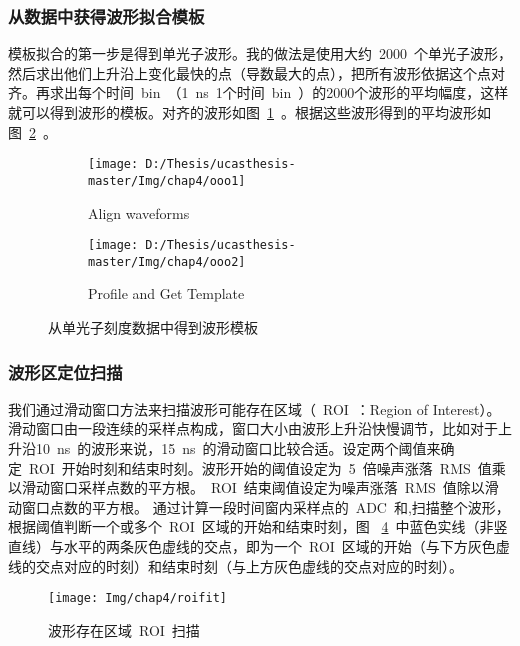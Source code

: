\subsubsection{从数据中获得波形拟合模板}
模板拟合的第一步是得到单光子波形。我的做法是使用大约~2000~个单光子波形，然后求出他们上升沿上变化最快的点（导数最大的点），把所有波形依据这个点对齐。再求出每个时间~bin~（1~ns~1个时间~bin~）的2000个波形的平均幅度，这样就可以得到波形的模板。对齐的波形如图~\ref{fig:ooo_1}~。根据这些波形得到的平均波形如图~\ref{fig:ooo_2}~。
\begin{figure}[!htbp]
  \centering
  \begin{subfigure}[b]{\MySubFactor\textwidth}
    \texttt{[image: D:/Thesis/ucasthesis-master/Img/chap4/ooo1]}
    \caption{ Align waveforms }
    \label{fig:ooo_1}
  \end{subfigure}%
  \quad
  \begin{subfigure}[b]{\MySubFactor\textwidth}
    \texttt{[image: D:/Thesis/ucasthesis-master/Img/chap4/ooo2]}
    \caption{ Profile and Get Template }
    \label{fig:ooo_2}
  \end{subfigure}
    \caption{ 从单光子刻度数据中得到波形模板 }
  \label{fig:ooo}
\end{figure}
\subsubsection{波形区定位扫描}
我们通过滑动窗口方法来扫描波形可能存在区域（~ROI~：Region of Interest）。滑动窗口由一段连续的采样点构成，窗口大小由波形上升沿快慢调节，比如对于上升沿10~ns~的波形来说，15~ns~的滑动窗口比较合适。设定两个阈值来确定~ROI~开始时刻和结束时刻。波形开始的阈值设定为~5~倍噪声涨落~RMS~值乘以滑动窗口采样点数的平方根。~ROI~结束阈值设定为噪声涨落~RMS~值除以滑动窗口点数的平方根。
通过计算一段时间窗内采样点的~ADC~和,扫描整个波形，根据阈值判断一个或多个~ROI~区域的开始和结束时刻，图
~\ref{fig:roifit}~中蓝色实线（非竖直线）与水平的两条灰色虚线的交点，即为一个~ROI~区域的开始（与下方灰色虚线的交点对应的时刻）和结束时刻（与上方灰色虚线的交点对应的时刻）。
\begin{figure}[!htbp]
  \centering
   \texttt{[image: Img/chap4/roifit]}
    \caption{波形存在区域~ROI~扫描}
  \label{fig:roifit}
\end{figure}

